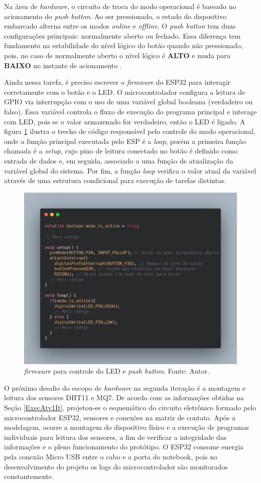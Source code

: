 Na área de \textit{hardware}, o circuito de troca do modo operacional é baseado no acionamento do \textit{push button}. Ao ser 
pressionado, o estado do dispositivo embarcado alterna entre os modos \textit{online} e \textit{offline}. O \textit{push button} 
tem duas configurações principais: normalmente aberto ou fechado. Essa diferença tem fundamento na estabilidade do nível lógico do botão 
quando não pressionado, pois, no caso de normalmente aberto o nível lógico é \textbf{ALTO} e muda para \textbf{BAIXO} no instante de acionamento \cite{arduino-docs}.

Ainda nessa tarefa, é preciso escrever o \textit{firmware} do ESP32 para interagir corretamente com o botão e o LED. O microcontrolador configura a 
leitura de GPIO via interrupção com o uso de uma variável global booleana (verdadeiro ou falso). Essa variável controla o fluxo de execução do programa principal 
e interage com LED, pois se o valor armazenado for verdadeiro, então o LED é ligado. A figura \ref{figPushButtonFirmware} ilustra o trecho de código responsável pelo controle do modo operacional, onde a função principal 
executada pelo ESP é a \textit{loop}, porém a primeira função chamada é a \textit{setup}, cujo pino de leitura conectado 
no botão é definido como entrada de dados e, em seguida, associado a uma função de atualização da variável global do sistema. Por fim, a função \textit{loop} 
verifica o valor atual da variável através de uma estrutura condicional para execução de tarefas distintas. 

\begin{figure}[ht]
    \centering
    \includegraphics[width=.62\textwidth]{img/push-button-firrmware.png}
    \caption{\textit{firmware} para controle do LED e \textit{push button}. Fonte: Autor.}\label{figPushButtonFirmware}
\end{figure}

O próximo desafio do escopo de \textit{hardware} na segunda iteração é a montagem e leitura dos sensores DHT11 e MQ7. De acordo 
com as informações obtidas na Seção \ref{ExecAtv1It}, projetou-se o esquemático do circuito eletrônico formado pelo microcontrolador ESP32, sensores e conexões na matriz de contato. 
Após a modelagem, ocorre a montagem do dispositivo físico e a execução de programas individuais para leitura dos sensores, a fim de verificar a 
integridade das informações e o pleno funcionamento do protótipo. O ESP32 consome energia pela conexão Micro USB entre o cabo e a porta do notebook, pois 
no desenvolvimento do projeto os logs do microcontrolador são monitorados constantemente. 

